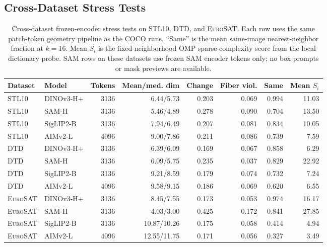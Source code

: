 \documentclass{article}
\newcommand{\dataset}[1]{\textsc{#1}}
\begin{document}
\subsection{Cross-Dataset Stress Tests}
\begin{table}[H]
\centering
\scriptsize
\setlength{\tabcolsep}{2.5pt}
\caption{Cross-dataset frozen-encoder stress tests on \dataset{STL10}, \dataset{DTD}, and \dataset{EuroSAT}. Each row uses the same patch-token geometry pipeline as the \dataset{COCO} runs. ``Same'' is the mean same-image nearest-neighbor fraction at $k=16$. Mean $S_i$ is the fixed-neighborhood OMP sparse-complexity score from the local dictionary probe. SAM rows on these datasets use frozen SAM encoder tokens only; no box prompts or mask previews are available.}
\label{tab:cross-dataset-stress}
\begin{tabular}{@{}llrrrrrr@{}}
\toprule
Dataset & Model & Tokens & Mean/med. dim & Change & Fiber viol. & Same & Mean $S_i$ \\
\midrule
\dataset{STL10} & DINOv3-H+ & 3136 & 6.44/5.73 & 0.203 & 0.069 & 0.994 & 11.03 \\
\dataset{STL10} & SAM-H & 3136 & 5.46/4.89 & 0.278 & 0.090 & 0.704 & 13.50 \\
\dataset{STL10} & SigLIP2-B & 3136 & 7.94/6.49 & 0.207 & 0.081 & 0.834 & 10.05 \\
\dataset{STL10} & AIMv2-L & 4096 & 9.00/7.86 & 0.211 & 0.086 & 0.739 & 7.59 \\
\dataset{DTD} & DINOv3-H+ & 3136 & 6.39/6.09 & 0.169 & 0.067 & 0.858 & 6.29 \\
\dataset{DTD} & SAM-H & 3136 & 6.09/5.75 & 0.235 & 0.037 & 0.829 & 22.92 \\
\dataset{DTD} & SigLIP2-B & 3136 & 9.21/8.59 & 0.179 & 0.074 & 0.732 & 7.24 \\
\dataset{DTD} & AIMv2-L & 4096 & 9.58/9.15 & 0.186 & 0.069 & 0.620 & 6.55 \\
\dataset{EuroSAT} & DINOv3-H+ & 3136 & 8.45/7.55 & 0.173 & 0.053 & 0.974 & 16.17 \\
\dataset{EuroSAT} & SAM-H & 3136 & 4.03/3.00 & 0.425 & 0.172 & 0.841 & 27.85 \\
\dataset{EuroSAT} & SigLIP2-B & 3136 & 10.87/10.26 & 0.175 & 0.058 & 0.414 & 4.94 \\
\dataset{EuroSAT} & AIMv2-L & 4096 & 12.55/11.75 & 0.171 & 0.056 & 0.327 & 3.49 \\
\bottomrule
\end{tabular}
\end{table}
\end{document}

